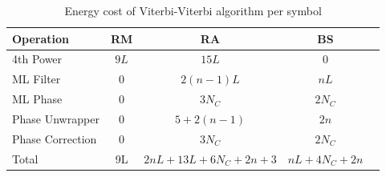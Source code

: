 \documentclass[12pt,a4paper]{article}
\begin{document}
\begin{table}[H]
    \centering
    \begin{tabular}{lcccc}
        \toprule
        Operation & RM & RA & BS \\
        \midrule
        4th Power & \(9L\) & \(15L\) & 0 \\
        ML Filter & 0 & \(2(n-1)L\) & \(nL\) \\
        ML Phase & 0 & \(3N_C\) & \(2N_C\) \\
        Phase Unwrapper & 0 & \(5 + 2(n-1)\) & \(2n\) \\
        Phase Correction & 0 & \(3N_C\) & \(2N_C\) \\
        Total & 9L & \(2nL + 13L + 6N_C + 2n + 3\) & \(nL + 4N_C + 2n\) \\
        \bottomrule
    \end{tabular}
    \caption{Energy cost of Viterbi-Viterbi algorithm per symbol}
    \label{tab:viterbi_viterbi_cost}
\end{table}
\end{document}
